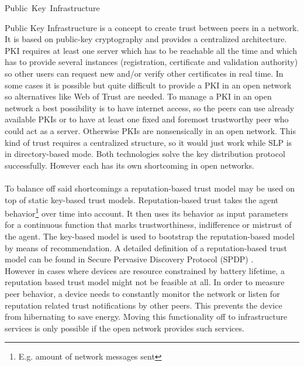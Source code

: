 \begin{description}
\item [Public~Key~Infrastructure]
\end{description}
Public Key Infrastructure is a concept to create trust between peers in a network. It is based on public-key cryptography and provides a centralized architecture. PKI requires at least one server which has to be reachable all the time and which has to provide several instances (registration, certificate and validation authority) so other users can request new and/or verify other certificates in real time. In some cases it is possible but quite difficult to provide a PKI in an open network so alternatives like Web of Trust are needed. To manage a PKI in an open network a best possibility is to have internet access, so the peers can use already available PKIs or to have at least one fixed and foremost trustworthy peer who could act as a server. Otherwise PKIs are nonsensically in an open network. This kind of trust requires a centralized structure, so it would just work while SLP is in directory-based mode. Both technologies solve the key distribution protocol successfully. However each has its own shortcoming in open networks.\\\\
To balance off said shortcomings a reputation-based trust model may be used on top of static key-based trust models. Reputation-based trust takes the agent behavior\footnote{E.g. amount of network messages sent} over time into account. It then uses its behavior as input parameters for a continuous function that marks trustworthiness, indifference or mistrust of the agent. The key-based model is used to bootstrap the reputation-based model by means of recommendation. A detailed definition of a reputation-based trust model can be found in Secure Pervasive Discovery Protocol (SPDP) \citep{Almenarez2003}.\\
However in cases where devices are resource constrained by battery lifetime, a reputation based trust model might not be feasible at all. In order to measure peer behavior, a device needs to constantly monitor the network or listen for reputation related trust notifications by other peers. This prevents the device from hibernating to save energy. Moving this functionality off to infrastructure services is only possible if the open network provides such services.

